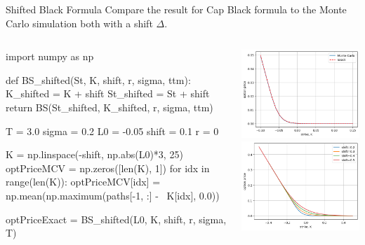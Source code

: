 \documentclass{beamer}
\begin{document}
\begin{frame}[fragile]{Shifted Black Formula}
	Compare the result for Cap Black formula to the Monte Carlo simulation both with a shift $\Delta$.
	\begin{columns}
		\begin{ipython}
import numpy as np
			
def BS_shifted(St, K, shift, r, sigma, ttm):
    K_shifted = K + shift
    St_shifted = St + shift
    return BS(St_shifted, K_shifted, r, sigma, ttm)
			
T = 3.0
sigma = 0.2
L0 = -0.05
shift = 0.1
r = 0
			
K = np.linspace(-shift, np.abs(L0)*3, 25)
optPriceMCV = np.zeros([len(K), 1])
for idx in range(len(K)):
    optPriceMCV[idx] = np.mean(np.maximum(paths[-1, :] - \
                               K[idx], 0.0))
			
optPriceExact = BS_shifted(L0, K, shift, r, sigma, T)
\end{ipython}
\begin{center}
	\includegraphics[width=0.65\linewidth]{images/shifted_call_BS_vs_MC}\\
	\includegraphics[width=0.65\linewidth]{images/shifted_call}
\end{center}
\end{columns}
\end{frame}
\end{document}
